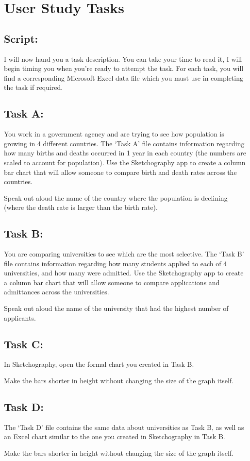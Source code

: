 \chapter{User Study Tasks}
\label{cha:tasks}

\section*{Script:}

I will now hand you a task description. You can take your time to read it, I will begin timing you when you’re ready to attempt the task. For each task, you will find a corresponding Microsoft Excel data file which you must use in completing the task if required.

\section*{Task A:}

You work in a government agency and are trying to see how population is growing in 4 different countries. The ‘Task A’ file contains information regarding how many births and deaths occurred in 1 year in each country (the numbers are scaled to account for population). Use the Sketchography app to create a column bar chart that will allow someone to compare birth and death rates across the countries.

Speak out aloud the name of the country where the population is declining (where the death rate is larger than the birth rate).

\section*{Task B:}

You are comparing universities to see which are the most selective. The ‘Task B’ file contains information regarding how many students applied to each of 4 universities, and how many were admitted. Use the Sketchography app to create a column bar chart that will allow someone to compare applications and admittances across the universities.

Speak out aloud the name of the university that had the highest number of applicants.

\section*{Task C:}

In Sketchography, open the formal chart you created in Task B.

Make the bars shorter in height without changing the size of the graph itself.

\section*{Task D:}

The ‘Task D’ file contains the same data about universities as Task B, as well as an Excel chart similar to the one you created in Sketchography in Task B.

Make the bars shorter in height without changing the size of the graph itself.